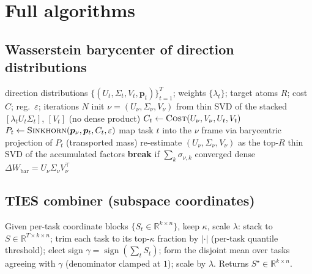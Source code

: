 \documentclass[11pt]{article}
\newcommand{\dW}{\Delta W}
\newcommand{\R}{\mathbb{R}}
\newcommand{\sign}{\operatorname{sign}}
\begin{document}
\section{Full algorithms}
\label{app:alg}

\subsection{Wasserstein barycenter of direction distributions}
\begin{algorithm}[H]
\caption{Free-support Wasserstein barycenter (M-bary core)}
\begin{algorithmic}[1]
\Require direction distributions $\{(U_t,\Sigma_t,V_t,\bm p_t)\}_{t=1}^T$; weights $\{\lambda_t\}$;
target atoms $R$; cost $C$; reg.\ $\varepsilon$; iterations $N$
\State init $\nu=(U_\nu,\Sigma_\nu,V_\nu)$ from thin SVD of the stacked $[\lambda_t U_t\Sigma_t]$,
$[V_t]$ (no dense product)
    \State $C_t \gets \textsc{Cost}(U_\nu,V_\nu,U_t,V_t)$ 
    \State $P_t \gets \textsc{Sinkhorn}(\bm p_\nu, \bm p_t, C_t, \varepsilon)$
    \State map task $t$ into the $\nu$ frame via barycentric projection of $P_t$ (transported mass)
  \EndFor
  \State re-estimate $(U_\nu,\Sigma_\nu,V_\nu)$ as the top-$R$ thin SVD of the accumulated factors
  \State \textbf{break} if $\sum_k\sigma_{\nu,k}$ converged
\EndFor
\State \Return dense $\dW_{\text{bar}} = U_\nu\Sigma_\nu V_\nu^\top$
\end{algorithmic}
\end{algorithm}

\subsection{TIES combiner (subspace coordinates)}
Given per-task coordinate blocks $\{S_t\in\R^{k\times n}\}$, keep $\kappa$, scale $\lambda$:
stack to $S\in\R^{T\times k\times n}$; trim each task to its top-$\kappa$ fraction by $|\cdot|$
(per-task quantile threshold); elect sign $\gamma=\sign(\sum_t S_t)$; form the disjoint mean over tasks
agreeing with $\gamma$ (denominator clamped at $1$); scale by $\lambda$. Returns $S^\star\in\R^{k\times n}$.
\end{document}
